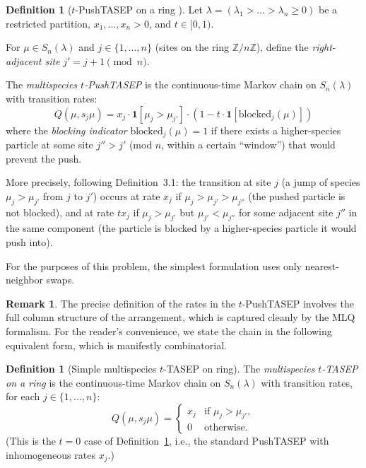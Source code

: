 \documentclass[12pt]{article}
\theoremstyle{definition}
\newtheorem{definition}[theorem]{Definition}
\newtheorem{remark}[theorem]{Remark}
\begin{document}
\begin{definition}[$t$-PushTASEP on a ring {\cite{CMW22}}]
\label{def:tpushtasep}
Let $\lambda = (\lambda_1 > \dots > \lambda_n \geq 0)$ be a restricted partition,
$x_1,\dots,x_n > 0$, and $t \in [0,1)$.

For $\mu \in S_n(\lambda)$ and $j \in \{1,\dots,n\}$ (sites on the ring
$\mathbb{Z}/n\mathbb{Z}$), define the \emph{right-adjacent site} $j' = j+1
\pmod n$.

The \emph{multispecies $t$-PushTASEP} is the continuous-time Markov chain on
$S_n(\lambda)$ with transition rates:
\begin{equation}\label{eq:tpushtasep}
  Q(\mu, s_j \mu) = x_j \cdot \mathbf{1}[\mu_j > \mu_{j'}]
  \cdot (1 - t \cdot \mathbf{1}[\text{blocked}_j(\mu)])
\end{equation}
where the \emph{blocking indicator} $\text{blocked}_j(\mu) = 1$ if there exists
a higher-species particle at some site $j'' > j'$ (mod $n$, within a certain
``window'') that would prevent the push.

More precisely, following \cite{CMW22} Definition~3.1: the transition at site
$j$ (a jump of species $\mu_j > \mu_{j'}$ from $j$ to $j'$) occurs at rate
$x_j$ if $\mu_j > \mu_{j'} > \mu_{j''}$ (the pushed particle is not blocked),
and at rate $tx_j$ if $\mu_j > \mu_{j'}$ but $\mu_{j'} < \mu_{j''}$ for some
adjacent site $j''$ in the same component (the particle is blocked by a
higher-species particle it would push into).

For the purposes of this problem, the simplest formulation uses only nearest-neighbor
swaps.
\end{definition}

\begin{remark}
The precise definition of the rates in the $t$-PushTASEP involves the full
column structure of the arrangement, which is captured cleanly by the MLQ
formalism.  For the reader's convenience, we state the chain in the following
equivalent form, which is manifestly combinatorial.
\end{remark}

\begin{definition}[Simple multispecies $t$-TASEP on ring]\label{def:tTASEP}
The \emph{multispecies $t$-TASEP on a ring} is the continuous-time Markov chain
on $S_n(\lambda)$ with transition rates, for each $j \in \{1,\dots,n\}$:
\begin{equation}\label{eq:tTASEP_rates}
  Q(\mu, s_j\mu) = \begin{cases}
    x_j & \text{if } \mu_j > \mu_{j'},\\
    0   & \text{otherwise.}
  \end{cases}
\end{equation}
(This is the $t=0$ case of Definition~\ref{def:tpushtasep}, i.e., the standard
PushTASEP with inhomogeneous rates $x_j$.)
\end{definition}
\end{document}
